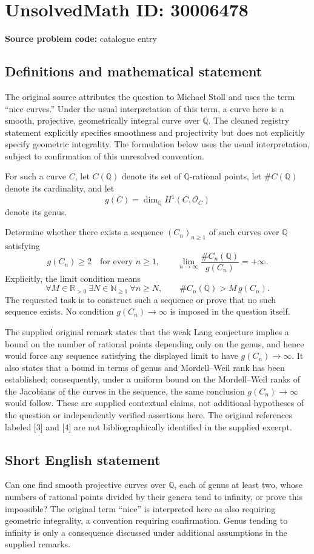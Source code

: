 \documentclass[11pt]{article}
\newcommand{\N}{\mathbb{N}}
\newcommand{\Q}{\mathbb{Q}}
\newcommand{\R}{\mathbb{R}}
\begin{document}
\section*{UnsolvedMath ID: 30006478}
\textbf{Source problem code:} catalogue entry
\subsection{Definitions and mathematical statement}
The original source attributes the question to Michael Stoll and uses the term ``nice curves.'' Under the usual interpretation of this term, a curve here is a smooth, projective, geometrically integral curve over \(\Q\). The cleaned registry statement explicitly specifies smoothness and projectivity but does not explicitly specify geometric integrality. The formulation below uses the usual interpretation, subject to confirmation of this unresolved convention.

For such a curve \(C\), let \(C(\Q)\) denote its set of \(\Q\)-rational points, let \(\#C(\Q)\) denote its cardinality, and let
\[
 g(C)=\dim_{\Q}H^1(C,\mathcal O_C)
\]
denote its genus.

Determine whether there exists a sequence \((C_n)_{n\geq1}\) of such curves over \(\Q\) satisfying
\[
 g(C_n)\geq2\quad\text{for every }n\geq1,
 \qquad
 \lim_{n\to\infty}\frac{\#C_n(\Q)}{g(C_n)}=+\infty.
\]
Explicitly, the limit condition means
\[
 \forall M\in\R_{>0}\ \exists N\in\N_{\geq1}\ \forall n\geq N,
 \qquad \#C_n(\Q)>M\,g(C_n).
\]
The requested task is to construct such a sequence or prove that no such sequence exists. No condition \(g(C_n)\to\infty\) is imposed in the question itself.

The supplied original remark states that the weak Lang conjecture implies a bound on the number of rational points depending only on the genus, and hence would force any sequence satisfying the displayed limit to have \(g(C_n)\to\infty\). It also states that a bound in terms of genus and Mordell--Weil rank has been established; consequently, under a uniform bound on the Mordell--Weil ranks of the Jacobians of the curves in the sequence, the same conclusion \(g(C_n)\to\infty\) would follow. These are supplied contextual claims, not additional hypotheses of the question or independently verified assertions here. The original references labeled [3] and [4] are not bibliographically identified in the supplied excerpt.
\subsection{Short English statement}
Can one find smooth projective curves over \(\Q\), each of genus at least two, whose numbers of rational points divided by their genera tend to infinity, or prove this impossible? The original term ``nice'' is interpreted here as also requiring geometric integrality, a convention requiring confirmation. Genus tending to infinity is only a consequence discussed under additional assumptions in the supplied remarks.
\end{document}

